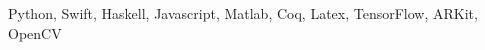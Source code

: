 \begin{cventries}
  \cventry
    {Python, Swift, Haskell, Javascript, Matlab, Coq, Latex, TensorFlow, ARKit, OpenCV}
    {}
    {}
    {}
    {}
\end{cventries}

